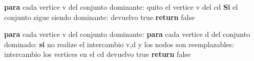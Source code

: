 \begin{codebox}
\li		\textbf{para} cada vertice v del conjunto dominante: \Do
\li			quito el vertice v del cd
\li			\textbf{Si} el conjunto sigue siendo dominante: \Do
\li				devuelvo true
\End
\End
\li \textbf{return} false
\end{codebox}

\begin{codebox}
\li		\textbf{para} cada vertice v del conjunto dominante: \Do
\li			\textbf{para} cada vertice d del conjunto dominado: \Do
\li				\textbf{si} no realize el intercambio v,d y los nodos son reemplazables: \Do
\li					intercambio los vertices en el cd
\li					devuelvo true
\End
\End
\End
\li \textbf{return} false
\end{codebox}

